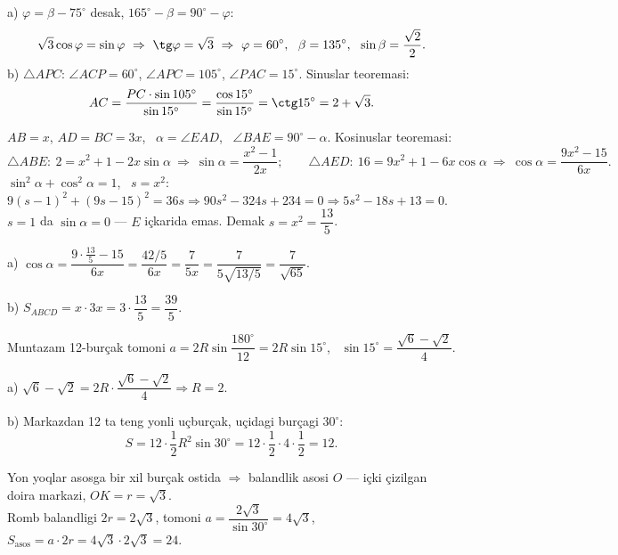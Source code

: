 a) $\varphi=\beta-75^\circ$ desak, $165^\circ-\beta=90^\circ-\varphi$:
\[\sqrt3\cos\varphi=\sin\varphi\ \Rightarrow\ \tg\varphi=\sqrt3\ \Rightarrow\ \varphi=60^\circ,\ \ \beta=135^\circ,\ \ \sin\beta=\frac{\sqrt2}2.\]
b) $\triangle APC$: $\angle ACP=60^\circ$, $\angle APC=105^\circ$, $\angle PAC=15^\circ$. Sinuslar teoremasi:
\[AC=\frac{PC\cdot\sin105^\circ}{\sin15^\circ}=\frac{\cos15^\circ}{\sin15^\circ}=\ctg15^\circ=2+\sqrt3.\]

\newpage
{}
$AB=x$, $AD=BC=3x$, \ $\alpha=\angle EAD$, \ $\angle BAE=90^\circ-\alpha$. Kosinuslar teoremasi:
\[\triangle ABE:\ 2=x^2+1-2x\sin\alpha\ \Rightarrow\ \sin\alpha=\frac{x^2-1}{2x};\qquad \triangle AED:\ 16=9x^2+1-6x\cos\alpha\ \Rightarrow\ \cos\alpha=\frac{9x^2-15}{6x}.\]
$\sin^2\alpha+\cos^2\alpha=1$, \ $s=x^2$: \ $9(s-1)^2+(9s-15)^2=36s\Rightarrow 90s^2-324s+234=0\Rightarrow 5s^2-18s+13=0$.\\
$s=1$ da $\sin\alpha=0$ — $E$ içkarida emas. Demak $s=x^2=\dfrac{13}5$.

a) $\cos\alpha=\dfrac{9\cdot\frac{13}5-15}{6x}=\dfrac{42/5}{6x}=\dfrac7{5x}=\dfrac7{5\sqrt{13/5}}=\dfrac7{\sqrt{65}}$.

b) $S_{ABCD}=x\cdot3x=3\cdot\dfrac{13}5=\dfrac{39}5$.

\newpage
{}
Muntazam 12-burçak tomoni $a=2R\sin\dfrac{180^\circ}{12}=2R\sin15^\circ$, \ $\sin15^\circ=\dfrac{\sqrt6-\sqrt2}4$.

a) $\sqrt6-\sqrt2=2R\cdot\dfrac{\sqrt6-\sqrt2}4\Rightarrow R=2$.

b) Markazdan 12 ta teng yonli uçburçak, uçidagi burçagi $30^\circ$:
\[S=12\cdot\frac12R^2\sin30^\circ=12\cdot\frac12\cdot4\cdot\frac12=12.\]

\newpage
{}
Yon yoqlar asosga bir xil burçak ostida $\Rightarrow$ balandlik asosi $O$ — içki çizilgan doira markazi, $OK=r=\sqrt3$.\\
Romb balandligi $2r=2\sqrt3$, tomoni $a=\dfrac{2\sqrt3}{\sin30^\circ}=4\sqrt3$, \ $S_{\text{asos}}=a\cdot2r=4\sqrt3\cdot2\sqrt3=24$.

